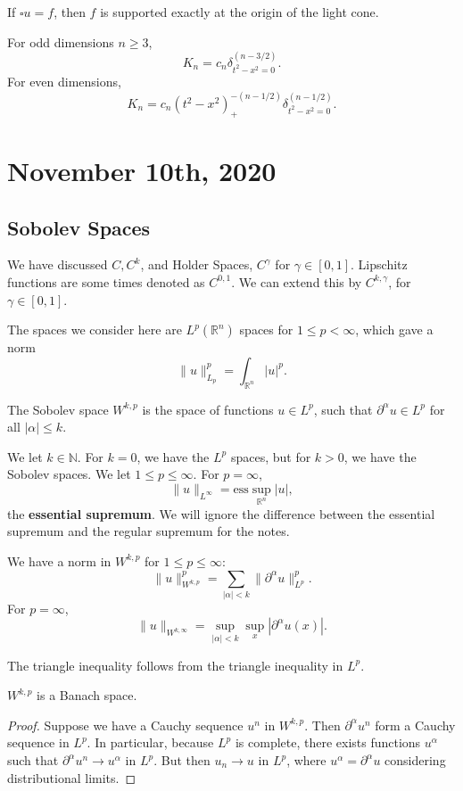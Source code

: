 \documentclass[11pt]{scrartcl}
\newcommand{\N}{\mathbb{N}}
\newcommand{\R}{\mathbb{R}}
\begin{document}
\begin{corollary} If $\square u = f$, then $f$ is supported exactly at the origin of the light cone.
\end{corollary}

For odd dimensions $n \ge 3$, 
$$K_n = c_n \delta_{t^2 - x^2 = 0}^{(n-3/2)}.$$
For even dimensions,
$$K_n = c_n (t^2 - x^2)_+^{-(n-1/2)} \delta_{t^2 - x^2 = 0}^{(n-1/2)}.$$

\pagebreak
\section{November 10th, 2020}
\subsection{Sobolev Spaces}
We have discussed $C, C^k$, and Holder Spaces, $C^\gamma$ for $\gamma \in [0, 1]$.  Lipschitz functions are some times denoted as $C^{0, 1}$.  We can extend this by $C^{k, \gamma}$, for $\gamma \in [0, 1]$.  

The spaces we consider here are $L^p(\R^n)$ spaces for $1 \le p < \infty$, which gave a norm $$\|u\|_{L_p}^p = \int_{\R^n}|u|^p.$$

\begin{definition} The Sobolev space $W^{k, p}$ is the space of functions $u \in L^p$, such that $\partial^\alpha u \in L^p$ for all $|\alpha| \le k$.
\end{definition}
We let $k \in \N$.  For $k = 0$, we have the $L^p$ spaces, but for $k > 0$, we have the Sobolev spaces.  We let $1 \le p \le \infty$.  For $p = \infty$,
$$\|u\|_{L^\infty} = \text{ess}\sup_{\R^n} |u|,$$
the \textbf{essential supremum}.  We will ignore the difference between the essential supremum and the regular supremum for the notes.

\begin{proposition} We have a norm in $W^{k, p}$ for $1 \le p \le \infty$:
$$\|u\|_{W^{k, p}}^p = \sum_{|\alpha| < k} \|\partial^\alpha u\|_{L^p}^p.$$
For $p = \infty$,
$$\|u\|_{W^{k, \infty}} = \sup_{|\alpha| < k} \sup_x |\partial^\alpha u(x)|.$$
\end{proposition}
\begin{remark} The triangle inequality follows from the triangle inequality in $L^p$.
\end{remark}

\begin{proposition} $W^{k, p}$ is a Banach space.
\end{proposition}
\begin{proof}
Suppose we have a Cauchy sequence $u^n$ in $W^{k, p}$.  Then $\partial^\alpha u^n$ form a Cauchy sequence in $L^p$.  In particular, because $L^p$ is complete, there exists functions $u^\alpha$ such that $\partial^\alpha u^n \to u^\alpha$ in $L^p$.  But then $u_n \to u$ in $L^p$, where $u^\alpha= \partial^\alpha u$ considering distributional limits.  
\end{proof}
\end{document}
